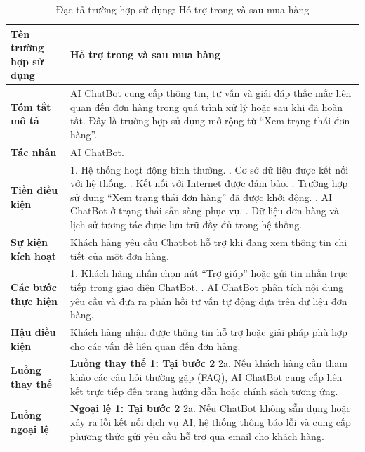{
\begin{longtable}{|>{\bfseries}p{4cm}|p{11.5cm}|}
\caption{Đặc tả trường hợp sử dụng: Hỗ trợ trong và sau mua hàng}
\label{tab:uc-post-purchase-support} \\
\hline
\textbf{Tên trường hợp sử dụng} & Hỗ trợ trong và sau mua hàng \\
\hline
\textbf{Tóm tắt mô tả} & AI ChatBot cung cấp thông tin, tư vấn và giải đáp thắc mắc liên quan đến đơn hàng trong quá trình xử lý hoặc sau khi đã hoàn tất. Đây là trường hợp sử dụng mở rộng từ “Xem trạng thái đơn hàng”. \\
\hline
\textbf{Tác nhân} & AI ChatBot. \\
\hline
\textbf{Tiền điều kiện} & 1. Hệ thống hoạt động bình thường. \newline
2. Cơ sở dữ liệu được kết nối với hệ thống. \newline
3. Kết nối với Internet được đảm bảo. \newline
4. Trường hợp sử dụng “Xem trạng thái đơn hàng” đã được khởi động. \newline
5. AI ChatBot ở trạng thái sẵn sàng phục vụ. \newline
6. Dữ liệu đơn hàng và lịch sử tương tác được lưu trữ đầy đủ trong hệ thống. \\
\hline
\textbf{Sự kiện kích hoạt} & Khách hàng yêu cầu Chatbot hỗ trợ khi đang xem thông tin chi tiết của một đơn hàng. \\
\hline
\textbf{Các bước thực hiện} & 1. Khách hàng nhấn chọn nút “Trợ giúp” hoặc gửi tin nhắn trực tiếp trong giao diện ChatBot. \newline
2. AI ChatBot phân tích nội dung yêu cầu và đưa ra phản hồi tư vấn tự động dựa trên dữ liệu đơn hàng. \\
\hline
\textbf{Hậu điều kiện} & Khách hàng nhận được thông tin hỗ trợ hoặc giải pháp phù hợp cho các vấn đề liên quan đến đơn hàng. \\
\hline
\textbf{Luồng thay thế} & \textbf{Luồng thay thế 1: Tại bước 2} \newline
2a. Nếu khách hàng cần tham khảo các câu hỏi thường gặp (FAQ), AI ChatBot cung cấp liên kết trực tiếp đến trang hướng dẫn hoặc chính sách tương ứng. \\
\hline
\textbf{Luồng ngoại lệ} & \textbf{Ngoại lệ 1: Tại bước 2} \newline
2a. Nếu ChatBot không sẵn dụng hoặc xảy ra lỗi kết nối dịch vụ AI, hệ thống thông báo lỗi và cung cấp phương thức gửi yêu cầu hỗ trợ qua email cho khách hàng. \\
\hline
\end{longtable}

}
